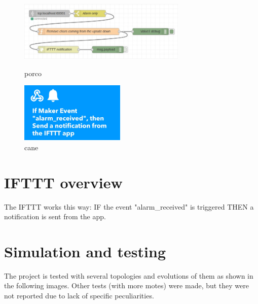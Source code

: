 \documentclass[11pt]{article}
\begin{document}
\begin{figure}[H]
  \begin{minipage}{0.6\textwidth}
    \includegraphics[height=108px]{Node-red-flow}
    \caption{porco}
  \end{minipage}
  \begin{minipage}{0.39\textwidth}
    \includegraphics[height=108px]{ifttt-screenshot}
    \caption{cane}
  \end{minipage}
\end{figure}

\section{IFTTT overview}
The IFTTT works this way: \newline
IF the event "alarm\_received" is triggered \newline
THEN a notification is sent from the app. \newline

\section{Simulation and testing}
The project is tested with several topologies and evolutions of them as shown in the following images. Other tests (with more motes) were made, but they were not reported due to lack of specific peculiarities. \newline

%
\end{document}
